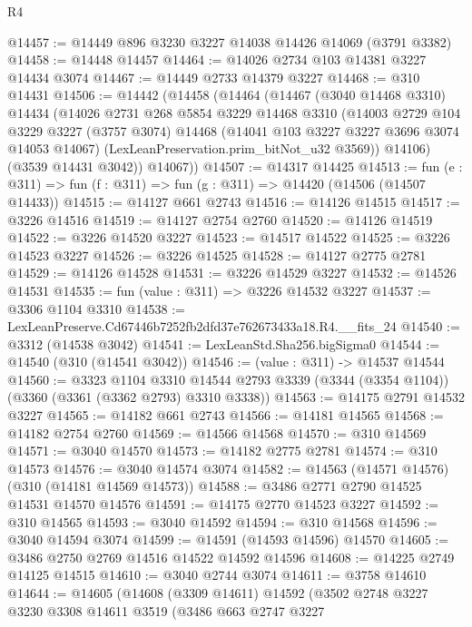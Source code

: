 \begin{lexlean}{R4}
\begin{coremodule}
@14457 := @14449 @896 @3230 @3227 @14038 @14426 @14069 (@3791 @3382)
@14458 := @14448 @14457
@14464 := @14026 @2734 @103 @14381 @3227 @14434 @3074
@14467 := @14449 @2733 @14379 @3227
@14468 := @310 @14431
@14506 := @14442
    (@14458
      (@14464
        (@14467
          (@3040 @14468 @3310)
          @14434
          (@14026
            @2731
            @268
            @5854
            @3229
            @14468
            @3310
            (@14003
              @2729
              @104
              @3229
              @3227
              (@3757 @3074)
              @14468
              (@14041 @103 @3227 @3227 @3696 @3074 @14053 @14067)
              (LexLeanPreservation.prim_bitNot_u32 @3569))
            @14106)
          (@3539 @14431 @3042))
        @14067))
@14507 := @14317 @14425
@14513 := fun (e : @311) => fun (f : @311) => fun (g : @311) => @14420 (@14506 (@14507 @14433))
@14515 := @14127 @661 @2743
@14516 := @14126 @14515
@14517 := @3226 @14516
@14519 := @14127 @2754 @2760
@14520 := @14126 @14519
@14522 := @3226 @14520 @3227
@14523 := @14517 @14522
@14525 := @3226 @14523 @3227
@14526 := @3226 @14525
@14528 := @14127 @2775 @2781
@14529 := @14126 @14528
@14531 := @3226 @14529 @3227
@14532 := @14526 @14531
@14535 := fun (value : @311) => @3226 @14532 @3227
@14537 := @3306 @1104 @3310
@14538 := LexLeanPreserve.Cd67446b7252fb2dfd37e762673433a18.R4.__fits_24
@14540 := @3312 (@14538 @3042)
@14541 := LexLeanStd.Sha256.bigSigma0
@14544 := @14540 (@310 (@14541 @3042))
@14546 := (value : @311) -> @14537 @14544
@14560 := @3323
    @1104
    @3310
    @14544
    @2793
    @3339
    (@3344 (@3354 @1104))
    (@3360 (@3361 (@3362 @2793) @3310 @3338))
@14563 := @14175 @2791 @14532 @3227
@14565 := @14182 @661 @2743
@14566 := @14181 @14565
@14568 := @14182 @2754 @2760
@14569 := @14566 @14568
@14570 := @310 @14569
@14571 := @3040 @14570
@14573 := @14182 @2775 @2781
@14574 := @310 @14573
@14576 := @3040 @14574 @3074
@14582 := @14563 (@14571 @14576) (@310 (@14181 @14569 @14573))
@14588 := @3486 @2771 @2790 @14525 @14531 @14570 @14576
@14591 := @14175 @2770 @14523 @3227
@14592 := @310 @14565
@14593 := @3040 @14592
@14594 := @310 @14568
@14596 := @3040 @14594 @3074
@14599 := @14591 (@14593 @14596) @14570
@14605 := @3486 @2750 @2769 @14516 @14522 @14592 @14596
@14608 := @14225 @2749 @14125 @14515
@14610 := @3040 @2744 @3074
@14611 := @3758 @14610
@14644 := @14605
    (@14608
      (@3309 @14611)
      @14592
      (@3502
        @2748
        @3227
        @3230
        @3308
        @14611
        @3519
        (@3486
          @663
          @2747
          @3227

\end{coremodule}
\end{lexlean}
